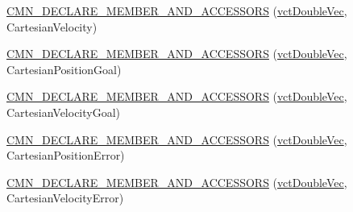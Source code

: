 {\bf }\par
\begin{DoxyCompactItemize}
\item 
\hyperlink{classprm_robot_state_a478deba9609acbb19a1e6df99b8b9c9d}{C\-M\-N\-\_\-\-D\-E\-C\-L\-A\-R\-E\-\_\-\-M\-E\-M\-B\-E\-R\-\_\-\-A\-N\-D\-\_\-\-A\-C\-C\-E\-S\-S\-O\-R\-S} (\hyperlink{vct_dynamic_vector_types_8h_ade4b3068c86fb88f41af2e5187e491c2}{vct\-Double\-Vec}, Cartesian\-Velocity)
\end{DoxyCompactItemize}

{\bf }\par
\begin{DoxyCompactItemize}
\item 
\hyperlink{classprm_robot_state_ae850d261074abb0f5635812cfe87d989}{C\-M\-N\-\_\-\-D\-E\-C\-L\-A\-R\-E\-\_\-\-M\-E\-M\-B\-E\-R\-\_\-\-A\-N\-D\-\_\-\-A\-C\-C\-E\-S\-S\-O\-R\-S} (\hyperlink{vct_dynamic_vector_types_8h_ade4b3068c86fb88f41af2e5187e491c2}{vct\-Double\-Vec}, Cartesian\-Position\-Goal)
\end{DoxyCompactItemize}

{\bf }\par
\begin{DoxyCompactItemize}
\item 
\hyperlink{classprm_robot_state_ac9f1b5e94ebf1e20b5fab040bb774a7c}{C\-M\-N\-\_\-\-D\-E\-C\-L\-A\-R\-E\-\_\-\-M\-E\-M\-B\-E\-R\-\_\-\-A\-N\-D\-\_\-\-A\-C\-C\-E\-S\-S\-O\-R\-S} (\hyperlink{vct_dynamic_vector_types_8h_ade4b3068c86fb88f41af2e5187e491c2}{vct\-Double\-Vec}, Cartesian\-Velocity\-Goal)
\end{DoxyCompactItemize}

{\bf }\par
\begin{DoxyCompactItemize}
\item 
\hyperlink{classprm_robot_state_a592d31476a58e719652e78921e5d16d5}{C\-M\-N\-\_\-\-D\-E\-C\-L\-A\-R\-E\-\_\-\-M\-E\-M\-B\-E\-R\-\_\-\-A\-N\-D\-\_\-\-A\-C\-C\-E\-S\-S\-O\-R\-S} (\hyperlink{vct_dynamic_vector_types_8h_ade4b3068c86fb88f41af2e5187e491c2}{vct\-Double\-Vec}, Cartesian\-Position\-Error)
\end{DoxyCompactItemize}

{\bf }\par
\begin{DoxyCompactItemize}
\item 
\hyperlink{classprm_robot_state_ae6fee3716d13e60f2ab0965da873e9a1}{C\-M\-N\-\_\-\-D\-E\-C\-L\-A\-R\-E\-\_\-\-M\-E\-M\-B\-E\-R\-\_\-\-A\-N\-D\-\_\-\-A\-C\-C\-E\-S\-S\-O\-R\-S} (\hyperlink{vct_dynamic_vector_types_8h_ade4b3068c86fb88f41af2e5187e491c2}{vct\-Double\-Vec}, Cartesian\-Velocity\-Error)
\end{DoxyCompactItemize}

